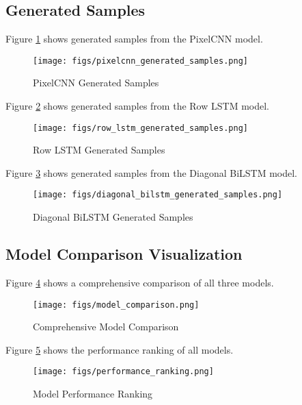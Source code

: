 \documentclass[norunningheads]{llncs}
\begin{document}
\subsection{Generated Samples}

Figure \ref{fig:pixelcnn_samples} shows generated samples from the PixelCNN model.

\begin{figure}[h]
\centering
\texttt{[image: figs/pixelcnn\_generated\_samples.png]}
\caption{PixelCNN Generated Samples}
\label{fig:pixelcnn_samples}
\end{figure}

Figure \ref{fig:row_lstm_samples} shows generated samples from the Row LSTM model.

\begin{figure}[h]
\centering
\texttt{[image: figs/row\_lstm\_generated\_samples.png]}
\caption{Row LSTM Generated Samples}
\label{fig:row_lstm_samples}
\end{figure}

Figure \ref{fig:diagonal_bilstm_samples} shows generated samples from the Diagonal BiLSTM model.

\begin{figure}[h]
\centering
\texttt{[image: figs/diagonal\_bilstm\_generated\_samples.png]}
\caption{Diagonal BiLSTM Generated Samples}
\label{fig:diagonal_bilstm_samples}
\end{figure}

\subsection{Model Comparison Visualization}

Figure \ref{fig:model_comparison} shows a comprehensive comparison of all three models.

\begin{figure}[h]
\centering
\texttt{[image: figs/model\_comparison.png]}
\caption{Comprehensive Model Comparison}
\label{fig:model_comparison}
\end{figure}

Figure \ref{fig:performance_ranking} shows the performance ranking of all models.

\begin{figure}[h]
\centering
\texttt{[image: figs/performance\_ranking.png]}
\caption{Model Performance Ranking}
\label{fig:performance_ranking}
\end{figure}
\end{document}
